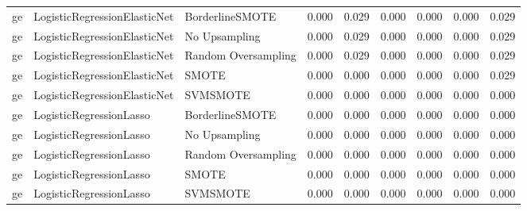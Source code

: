 \begin{tabular}{lllllllll}
      ge &    LogisticRegressionElasticNet &               BorderlineSMOTE &     0.000 &                     0.029 &                 0.000 &                  0.000 &                                   0.000 &     0.029 \\
      ge &    LogisticRegressionElasticNet &                 No Upsampling &     0.000 &                     0.029 &                 0.000 &                  0.000 &                                   0.000 &     0.029 \\
      ge &    LogisticRegressionElasticNet &           Random Oversampling &     0.000 &                     0.029 &                 0.000 &                  0.000 &                                   0.000 &     0.029 \\
      ge &    LogisticRegressionElasticNet &                         SMOTE &     0.000 &                     0.000 &                 0.000 &                  0.000 &                                   0.000 &     0.029 \\
      ge &    LogisticRegressionElasticNet &                      SVMSMOTE &     0.000 &                     0.000 &                 0.000 &                  0.000 &                                   0.000 &     0.000 \\
      ge &         LogisticRegressionLasso &               BorderlineSMOTE &     0.000 &                     0.000 &                 0.000 &                  0.000 &                                   0.000 &     0.000 \\
      ge &         LogisticRegressionLasso &                 No Upsampling &     0.000 &                     0.000 &                 0.000 &                  0.000 &                                   0.000 &     0.000 \\
      ge &         LogisticRegressionLasso &           Random Oversampling &     0.000 &                     0.000 &                 0.000 &                  0.000 &                                   0.000 &     0.000 \\
      ge &         LogisticRegressionLasso &                         SMOTE &     0.000 &                     0.000 &                 0.000 &                  0.000 &                                   0.000 &     0.000 \\
      ge &         LogisticRegressionLasso &                      SVMSMOTE &     0.000 &                     0.000 &                 0.000 &                  0.000 &                                   0.000 &     0.000 \\

\end{tabular}
